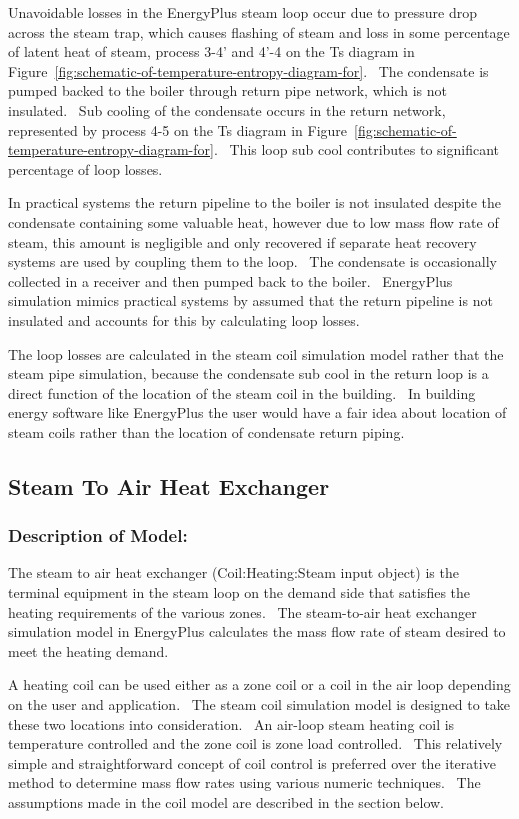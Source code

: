 Unavoidable losses in the EnergyPlus steam loop occur due to pressure drop across the steam trap, which causes flashing of steam and loss in some percentage of latent heat of steam, process 3-4' and 4'-4 on the Ts diagram in Figure~\ref{fig:schematic-of-temperature-entropy-diagram-for}.~ The condensate is pumped backed to the boiler through return pipe network, which is not insulated.~ Sub cooling of the condensate occurs in the return network, represented by process 4-5 on the Ts diagram in Figure~\ref{fig:schematic-of-temperature-entropy-diagram-for}.~ This loop sub cool contributes to significant percentage of loop losses.

In practical systems the return pipeline to the boiler is not insulated despite the condensate containing some valuable heat, however due to low mass flow rate of steam, this amount is negligible and only recovered if separate heat recovery systems are used by coupling them to the loop.~ The condensate is occasionally collected in a receiver and then pumped back to the boiler.~ EnergyPlus simulation mimics practical systems by assumed that the return pipeline is not insulated and accounts for this by calculating loop losses.

The loop losses are calculated in the steam coil simulation model rather that the steam pipe simulation, because the condensate sub cool in the return loop is a direct function of the location of the steam coil in the building.~ In building energy software like EnergyPlus the user would have a fair idea about location of steam coils rather than the location of condensate return piping.

\subsection{Steam To Air Heat Exchanger}\label{steam-to-air-heat-exchanger}

\subsubsection{Description of Model:}\label{description-of-model-001}

The steam to air heat exchanger (Coil:Heating:Steam input object) is the terminal equipment in the steam loop on the demand side that satisfies the heating requirements of the various zones.~ The steam-to-air heat exchanger simulation model in EnergyPlus calculates the mass flow rate of steam desired to meet the heating demand.

A heating coil can be used either as a zone coil or a coil in the air loop depending on the user and application.~ The steam coil simulation model is designed to take these two locations into consideration.~ An air-loop steam heating coil is temperature controlled and the zone coil is zone load controlled.~ This relatively simple and straightforward concept of coil control is preferred over the iterative method to determine mass flow rates using various numeric techniques.~ The assumptions made in the coil model are described in the section below.

